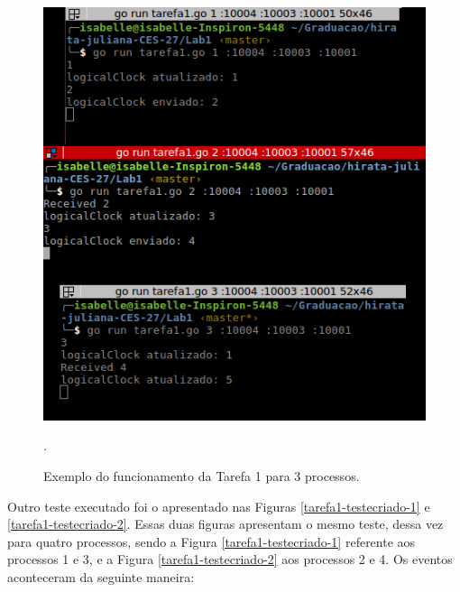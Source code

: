 \documentclass[conference]{IEEEtran}
\begin{document}
\begin{figure}[H]
\centering
\centerline{\includegraphics[scale=0.45]{imagens/tarefa1-testeslide.png}}
\caption{Exemplo do funcionamento da Tarefa 1 para 3 processos.}.
\label{tarefa1-testeslide}
\end{figure}
	
	Outro teste executado foi o apresentado nas Figuras \ref{tarefa1-testecriado-1} e \ref{tarefa1-testecriado-2}. Essas duas figuras apresentam o mesmo teste, dessa vez para quatro processos, sendo a Figura \ref{tarefa1-testecriado-1} referente aos processos 1 e 3, e a Figura \ref{tarefa1-testecriado-2} aos processos 2 e 4. Os eventos aconteceram da seguinte maneira:
	
\end{document}
